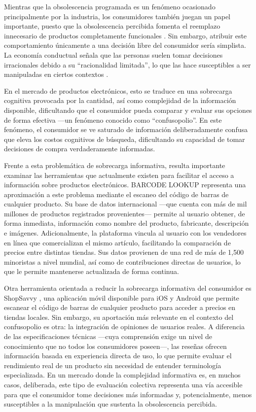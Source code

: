 Mientras que la obsolescencia programada es un fenómeno ocasionado
principalmente por la industria, los consumidores también juegan un papel
importante, puesto que la obsolescencia percibida fomenta el reemplazo
innecesario de productos completamente funcionales
\parencite[pp.~6-7]{corrocher2025}. Sin embargo, atribuir este comportamiento
únicamente a una decisión libre del consumidor sería simplista. La economía
conductual señala que las personas suelen tomar decisiones irracionales debido a
su ``racionalidad limitada'', lo que las hace susceptibles a ser manipuladas en
ciertos contextos \parencite[pp.~725-726]{malinauskaite2021}.

En el mercado de productos electrónicos, esto se traduce en una sobrecarga
cognitiva provocada por la cantidad, así como complejidad de la información
disponible, dificultando que el consumidor pueda comparar y evaluar sus opciones
de forma efectiva —un fenómeno conocido como ``confusopolio''. En este fenómeno,
el consumidor se ve saturado de información deliberadamente confusa que eleva
los costos cognitivos de búsqueda, dificultando su capacidad de tomar decisiones
de compra verdaderamente informadas. 

Frente a esta problemática de sobrecarga informativa, resulta importante
examinar las herramientas que actualmente existen para facilitar el acceso a
información sobre productos electrónicos. BARCODE LOOKUP representa una
aproximación a este problema mediante el escaneo del código de barras de
cualquier producto. Su base de datos internacional —que cuenta con más de mil
millones de productos registrados provenientes— permite al usuario obtener, de
forma inmediata, información como nombre del producto, fabricante, descripción e
imágenes. Adicionalmente, la plataforma vincula al usuario con los vendedores en
línea que comercializan el mismo artículo, facilitando la comparación de precios
entre distintas tiendas. Sus datos provienen de una red de más de 1,500
minoristas a nivel mundial, así como de contribuciones directas de usuarios, lo
que le permite mantenerse actualizada de forma continua. 

Otra herramienta orientada a reducir la sobrecarga informativa del consumidor es
ShopSavvy \parencite{shopsavvy2008}, una aplicación móvil disponible para iOS y
Android que permite escanear el código de barras de cualquier producto para
acceder a precios en tiendas locales. Sin embargo, su aportación más relevante
en el contexto del confusopolio es otra: la integración de opiniones de usuarios
reales. A diferencia de las especificaciones técnicas —cuya comprensión exige un
nivel de conocimiento que no todos los consumidores poseen—, las reseñas ofrecen
información basada en experiencia directa de uso, lo que permite evaluar el
rendimiento real de un producto sin necesidad de entender terminología
especializada. En un mercado donde la complejidad informativa es, en muchos
casos, deliberada, este tipo de evaluación colectiva representa una vía
accesible para que el consumidor tome decisiones más informadas y,
potencialmente, menos susceptibles a la manipulación que sustenta la
obsolescencia percibida. 

